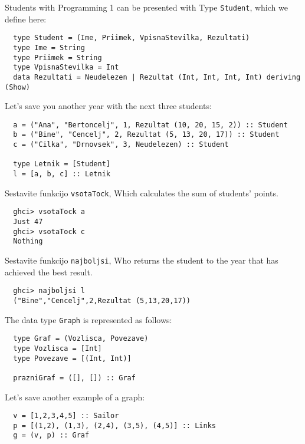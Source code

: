 \documentclass[arhiv]{../izpit}
\begin{document}


Students with Programming 1 can be presented with
Type \texttt{Student}, which we define here:
\begin{verbatim}
  type Student = (Ime, Priimek, VpisnaStevilka, Rezultati)
  type Ime = String
  type Priimek = String
  type VpisnaStevilka = Int
  data Rezultati = Neudelezen | Rezultat (Int, Int, Int, Int) deriving (Show)
\end{verbatim}

Let's save you another year with the next three students:
\begin{verbatim}
  a = ("Ana", "Bertoncelj", 1, Rezultat (10, 20, 15, 2)) :: Student
  b = ("Bine", "Cencelj", 2, Rezultat (5, 13, 20, 17)) :: Student
  c = ("Cilka", "Drnovsek", 3, Neudelezen) :: Student
  
  type Letnik = [Student]
  l = [a, b, c] :: Letnik
\end{verbatim}

\podnaloga
  Sestavite funkcijo \texttt{vsotaTock}, Which calculates the sum of students' points.
  \begin{verbatim}
  ghci> vsotaTock a
  Just 47
  ghci> vsotaTock c
  Nothing
  \end{verbatim}

\podnaloga
  Sestavite funkcijo \texttt{najboljsi}, Who returns the student to the year that has achieved the best result.
  \begin{verbatim}
  ghci> najboljsi l
  ("Bine","Cencelj",2,Rezultat (5,13,20,17))
  \end{verbatim}



The data type \texttt{Graph} is represented as follows:

  \begin{verbatim}
  type Graf = (Vozlisca, Povezave)
  type Vozlisca = [Int]
  type Povezave = [(Int, Int)]

  prazniGraf = ([], []) :: Graf
  \end{verbatim}

Let's save another example of a graph:
  \begin{verbatim}
  v = [1,2,3,4,5] :: Sailor
  p = [(1,2), (1,3), (2,4), (3,5), (4,5)] :: Links
  g = (v, p) :: Graf
  \end{verbatim}
\end{document}
